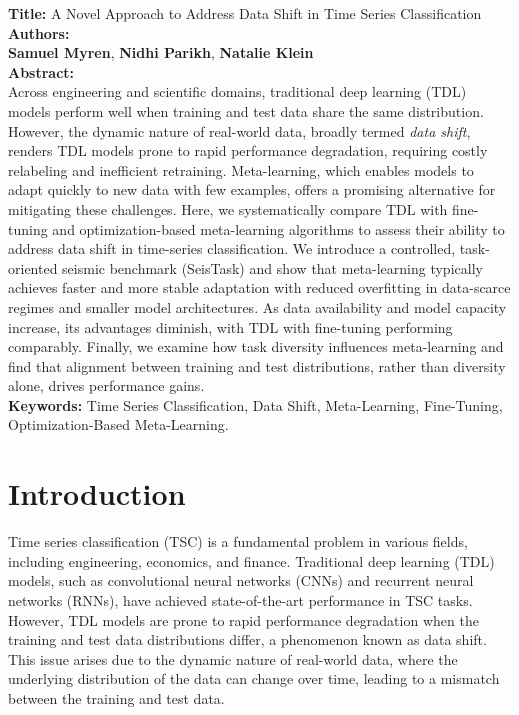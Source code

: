 \documentclass{article}
\begin{document}
\begin{titlepage}
\begin{center}
\vspace*{0.5cm}
\textbf{Title:} A Novel Approach to Address Data Shift in Time Series Classification \\
\vspace*{0.2cm}
\textbf{Authors:} \\
\textbf{Samuel Myren}, \textbf{Nidhi Parikh}, \textbf{Natalie Klein} \\
\vspace*{0.2cm}
\textbf{Abstract:} \\
Across engineering and scientific domains, traditional deep learning (TDL) models perform well when training and test data share the same distribution. However, the dynamic nature of real-world data, broadly termed \textit{data shift}, renders TDL models prone to rapid performance degradation, requiring costly relabeling and inefficient retraining. Meta-learning, which enables models to adapt quickly to new data with few examples, offers a promising alternative for mitigating these challenges. Here, we systematically compare TDL with fine-tuning and optimization-based meta-learning algorithms to assess their ability to address data shift in time-series classification. We introduce a controlled, task-oriented seismic benchmark (SeisTask) and show that meta-learning typically achieves faster and more stable adaptation with reduced overfitting in data-scarce regimes and smaller model architectures. As data availability and model capacity increase, its advantages diminish, with TDL with fine-tuning performing comparably. Finally, we examine how task diversity influences meta-learning and find that alignment between training and test distributions, rather than diversity alone, drives performance gains. \\
\vspace*{0.2cm}
\textbf{Keywords:} Time Series Classification, Data Shift, Meta-Learning, Fine-Tuning, Optimization-Based Meta-Learning. \\
\vspace*{0.5cm}
\end{center}
\end{titlepage}

\section{Introduction}
Time series classification (TSC) is a fundamental problem in various fields, including engineering, economics, and finance. Traditional deep learning (TDL) models, such as convolutional neural networks (CNNs) and recurrent neural networks (RNNs), have achieved state-of-the-art performance in TSC tasks. However, TDL models are prone to rapid performance degradation when the training and test data distributions differ, a phenomenon known as data shift. This issue arises due to the dynamic nature of real-world data, where the underlying distribution of the data can change over time, leading to a mismatch between the training and test data.
\end{document}
